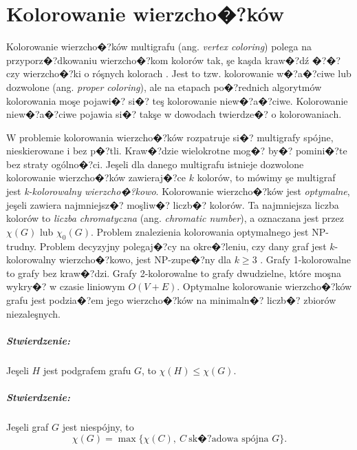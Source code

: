 \documentclass[12pt,a4paper]{mwrep}
\begin{document}
\chapter{Kolorowanie wierzcho�?ków}
\label{ch:kolorowanie_wierzcholkow}

Kolorowanie wierzcho�?ków multigrafu (ang. \emph{vertex coloring})
polega na przyporz�?dkowaniu wierzcho�?kom kolorów tak, 
şe kaşda kraw�?dź �?�?czy wierzcho�?ki o róşnych kolorach
\cite{wiki_graph_coloring}.
Jest to tzw. kolorowanie w�?a�?ciwe lub dozwolone
(ang. \emph{proper coloring}), ale na etapach po�?rednich algorytmów
kolorowania moşe pojawi�? si�? teş kolorowanie niew�?a�?ciwe.
Kolorowanie niew�?a�?ciwe pojawia si�? takşe w dowodach twierdze�?
o kolorowaniach.

W problemie kolorowania wierzcho�?ków
rozpatruje si�? multigrafy spójne, nieskierowane i bez p�?tli.
Kraw�?dzie wielokrotne mog�? by�? pomini�?te bez straty ogólno�?ci.
Jeşeli dla danego multigrafu istnieje dozwolone kolorowanie
wierzcho�?ków zawieraj�?ce $k$ kolorów, to mówimy şe multigraf
jest \emph{k-kolorowalny wierzcho�?kowo}.
Kolorowanie wierzcho�?ków jest \emph{optymalne},
jeşeli zawiera najmniejsz�? moşliw�? liczb�? kolorów.
Ta najmniejsza liczba kolorów to \emph{liczba chromatyczna}
(ang. \emph{chromatic number}),
a oznaczana jest przez $\chi(G)$ lub $\chi_0(G)$.
Problem znalezienia kolorowania optymalnego jest NP-trudny.
Problem decyzyjny polegaj�?cy na okre�?leniu, czy dany graf jest
$k$-kolorowalny wierzcho�?kowo, jest NP-zupe�?ny dla $k \ge 3$
\cite{1976_Garey_J_S}.
Grafy 1-kolorowalne to grafy bez kraw�?dzi.
Grafy 2-kolorowalne to grafy dwudzielne, które moşna wykry�?
w czasie liniowym $O(V+E)$.
Optymalne kolorowanie wierzcho�?ków grafu jest podzia�?em
jego wierzcho�?ków na minimaln�? liczb�? zbiorów niezaleşnych.

\paragraph{Stwierdzenie:} Jeşeli $H$ jest podgrafem grafu $G$,
to $\chi(H) \le \chi(G)$.

\paragraph{Stwierdzenie:} Jeşeli graf $G$ jest niespójny, to
\begin{equation}
\chi(G) = \operatorname{max} \{ 
\chi(C),\ C\ \mbox{sk�?adowa spójna $G$} \}.
\end{equation}
\end{document}
